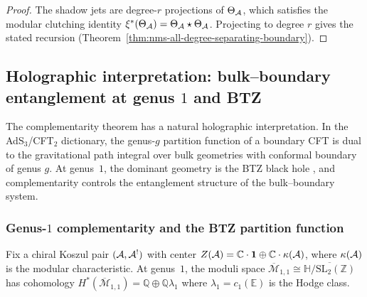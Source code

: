 \begin{proof}
The shadow jets are degree-$r$ projections of $\Theta_{\mathcal{A}}$,
which satisfies the modular clutching identity
$\xi^*(\Theta_{\mathcal{A}}) = \Theta_{\mathcal{A}} \star \Theta_{\mathcal{A}}$.
Projecting to degree $r$ gives the stated recursion
(Theorem~\ref{thm:nms-all-degree-separating-boundary}).
\end{proof}

%
%

\subsection{Holographic interpretation: bulk--boundary
entanglement at genus $1$ and BTZ}
\label{subsec:thqg-III-holographic-entanglement}

The complementarity theorem has a natural holographic
interpretation. In the AdS$_3$/CFT$_2$ dictionary, the genus-$g$
partition function of a boundary CFT is dual to the gravitational
path integral over bulk geometries with conformal boundary of
genus $g$. At genus~$1$, the dominant geometry is the
BTZ black hole \cite{BTZ92}, and complementarity controls
the entanglement structure of the bulk--boundary system.

\subsubsection{Genus-$1$ complementarity and the BTZ
partition function}
\label{subsubsec:thqg-III-btz}

\begin{setup}
\label{setup:thqg-III-genus-1}
Fix a chiral Koszul pair $(\mathcal{A}, \mathcal{A}^!)$ with center
$Z(\mathcal{A}) = \mathbb{C} \cdot \mathbf{1} \oplus
\mathbb{C} \cdot \kappa(\mathcal{A})$, where $\kappa(\mathcal{A})$ is the
modular characteristic.
At genus~$1$, the moduli space
$\overline{\mathcal{M}}_{1,1} \cong \overline{\mathbb{H}/\mathrm{SL}_2(\mathbb{Z})}$
has cohomology
$H^*(\overline{\mathcal{M}}_{1,1})
= \mathbb{Q} \oplus \mathbb{Q}\lambda_1$
where $\lambda_1 = c_1(\mathbb{E})$ is the Hodge class.
\end{setup}

